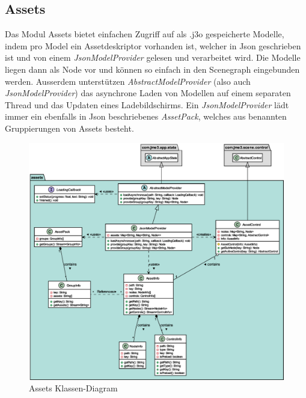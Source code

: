\subsection{Assets}

Das Modul Assets bietet einfachen Zugriff auf als .j3o gespeicherte Modelle, indem pro Model ein Assetdeskriptor vorhanden ist, welcher
in Json geschrieben ist und von einem \textit{JsonModelProvider} gelesen und verarbeitet wird. Die Modelle liegen dann als Node vor und können so einfach
in den Scenegraph eingebunden werden. Ausserdem unterstützen \textit{AbstractModelProvider} (also auch \textit{JsonModelProvider}) das asynchrone Laden von Modellen
auf einem separaten Thread und das Updaten eines Ladebildschirms. Ein \textit{JsonModelProvider} lädt immer ein ebenfalls in Json beschriebenes \textit{AssetPack},
welches aus benannten Gruppierungen von Assets besteht.

\begin{figure}[htbp]
    \centering
    \includegraphics[width=\linewidth]{Assets/assets.eps}
    \caption{Assets Klassen-Diagram}
\end{figure}

\pagebreak